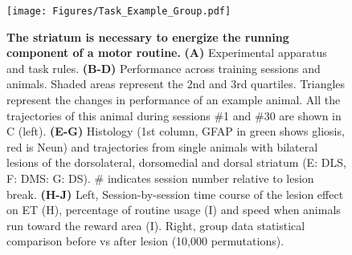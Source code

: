 \begin{figure}[h!]
 \begin{center}
	\texttt{[image: Figures/Task\_Example\_Group.pdf]}
	\caption
	{\textbf{The striatum is necessary to energize the running component of a motor routine.}
	\textbf{(A)} Experimental apparatus and task rules.
	\textbf{(B-D)} Performance across training sessions and animals.
	Shaded areas represent the 2nd and 3rd quartiles. Triangles represent the changes in performance of an example animal. 
	All the trajectories of this animal during sessions \#1 and \#30 are shown in C (left). 
	\textbf{(E-G)} Histology (1st column, GFAP in green shows gliosis, red is Neun) and trajectories from single animals with bilateral lesions of the dorsolateral, dorsomedial and dorsal striatum (E: DLS, F: DMS: G: DS).
	\# indicates session number relative to lesion break.
	\textbf{(H-J)} Left, Session-by-session time course of the lesion effect on ET (H), percentage of routine usage (I) and speed when animals run toward the reward area (I).
	Right, group data statistical comparison before vs after lesion (10,000 permutations).
	}
	\label{fig1}
 \end{center}
\end{figure}
